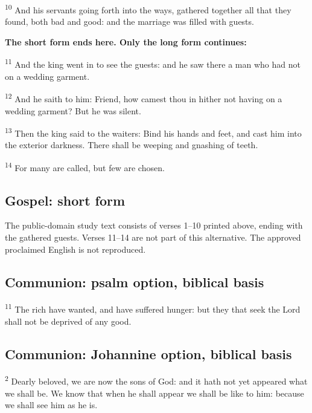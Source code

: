 \textsuperscript{10} And his servants going forth into the ways, gathered together all that they found, both bad and good: and the marriage was filled with guests.

\textbf{The short form ends here. Only the long form continues:}

\textsuperscript{11} And the king went in to see the guests: and he saw there a man who had not on a wedding garment.

\textsuperscript{12} And he saith to him: Friend, how camest thou in hither not having on a wedding garment? But he was silent.

\textsuperscript{13} Then the king said to the waiters: Bind his hands and feet, and cast him into the exterior darkness. There shall be weeping and gnashing of teeth.

\textsuperscript{14} For many are called, but few are chosen.

\subsection{Gospel: short form}
\label{proper-gospel-short}
The public-domain study text consists of verses 1--10 printed above, ending with the gathered guests. Verses 11--14 are not part of this alternative. The approved proclaimed English is not reproduced.

\subsection{Communion: psalm option, biblical basis}
\label{proper-communion-psalm}

\textsuperscript{11} The rich have wanted, and have suffered hunger: but they that seek the Lord shall not be deprived of any good.

\subsection{Communion: Johannine option, biblical basis}
\label{proper-communion-john}

\textsuperscript{2} Dearly beloved, we are now the sons of God: and it hath not yet appeared what we shall be. We know that when he shall appear we shall be like to him: because we shall see him as he is.
